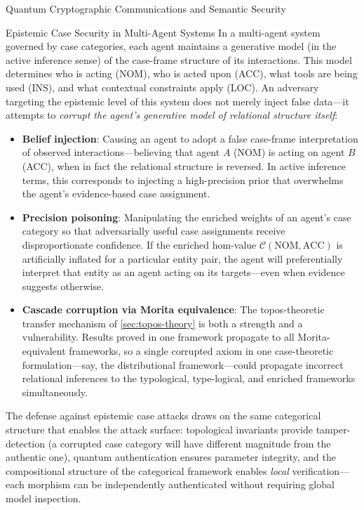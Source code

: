 \documentclass[
  ignorenonframetext,
]{beamer}
\begin{document}
\begin{frame}{Quantum Cryptographic Communications and Semantic
Security}
\begin{block}{Epistemic Case Security in Multi-Agent Systems}
In a multi-agent system governed by case categories, each agent
maintains a generative model (in the active inference sense) of the
case-frame structure of its interactions. This model determines who is
acting (NOM), who is acted upon (ACC), what tools are being used (INS),
and what contextual constraints apply (LOC). An adversary targeting the
epistemic level of this system does not merely inject false data---it
attempts to \emph{corrupt the agent's generative model of relational
structure itself}:

\begin{itemize}
\item
  \textbf{Belief injection}: Causing an agent to adopt a false
  case-frame interpretation of observed interactions---believing that
  agent \(A\) (NOM) is acting on agent \(B\) (ACC), when in fact the
  relational structure is reversed. In active inference terms, this
  corresponds to injecting a high-precision prior that overwhelms the
  agent's evidence-based case assignment.
\item
  \textbf{Precision poisoning}: Manipulating the enriched weights of an
  agent's case category so that adversarially useful case assignments
  receive disproportionate confidence. If the enriched hom-value
  \(\mathcal{C}(\text{NOM}, \text{ACC})\) is artificially inflated for a
  particular entity pair, the agent will preferentially interpret that
  entity as an agent acting on its targets---even when evidence suggests
  otherwise.
\item
  \textbf{Cascade corruption via Morita equivalence}: The
  topos-theoretic transfer mechanism of \autoref{sec:topos-theory} is
  both a strength and a vulnerability. Results proved in one framework
  propagate to all Morita-equivalent frameworks, so a single corrupted
  axiom in one case-theoretic formulation---say, the distributional
  framework---could propagate incorrect relational inferences to the
  typological, type-logical, and enriched frameworks simultaneously.
\end{itemize}

The defense against epistemic case attacks draws on the same categorical
structure that enables the attack surface: topological invariants
provide tamper-detection (a corrupted case category will have different
magnitude from the authentic one), quantum authentication ensures
parameter integrity, and the compositional structure of the categorical
framework enables \emph{local} verification---each morphism can be
independently authenticated without requiring global model inspection.
\end{block}
\end{frame}
\end{document}
